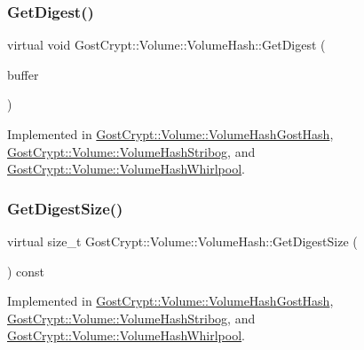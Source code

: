 \subsubsection{\texorpdfstring{Get\+Digest()}{GetDigest()}}
{\footnotesize\ttfamily virtual void Gost\+Crypt\+::\+Volume\+::\+Volume\+Hash\+::\+Get\+Digest (\begin{DoxyParamCaption}\item[{\hyperlink{class_gost_crypt_1_1_buffer_ptr}{Buffer\+Ptr} \&}]{buffer }\end{DoxyParamCaption})\hspace{0.3cm}{\ttfamily [pure virtual]}}



Implemented in \hyperlink{class_gost_crypt_1_1_volume_1_1_volume_hash_gost_hash_a6973bd428bcff6dfaaa524dc825db4ca}{Gost\+Crypt\+::\+Volume\+::\+Volume\+Hash\+Gost\+Hash}, \hyperlink{class_gost_crypt_1_1_volume_1_1_volume_hash_stribog_a90a203ac607353bad84ebb6f6ad09cda}{Gost\+Crypt\+::\+Volume\+::\+Volume\+Hash\+Stribog}, and \hyperlink{class_gost_crypt_1_1_volume_1_1_volume_hash_whirlpool_ab59cbd894c5f44c05ea98555542f8f75}{Gost\+Crypt\+::\+Volume\+::\+Volume\+Hash\+Whirlpool}.

\mbox{\label{class_gost_crypt_1_1_volume_1_1_volume_hash_a3677448f436ac856778274dafdc36ed4}} 
\subsubsection{\texorpdfstring{Get\+Digest\+Size()}{GetDigestSize()}}
{\footnotesize\ttfamily virtual size\+\_\+t Gost\+Crypt\+::\+Volume\+::\+Volume\+Hash\+::\+Get\+Digest\+Size (\begin{DoxyParamCaption}{ }\end{DoxyParamCaption}) const\hspace{0.3cm}{\ttfamily [pure virtual]}}



Implemented in \hyperlink{class_gost_crypt_1_1_volume_1_1_volume_hash_gost_hash_ae81d30ef1de076a62769fde28057762e}{Gost\+Crypt\+::\+Volume\+::\+Volume\+Hash\+Gost\+Hash}, \hyperlink{class_gost_crypt_1_1_volume_1_1_volume_hash_stribog_ad29dc8a4e0ed0f2f3e20afc2f691c74d}{Gost\+Crypt\+::\+Volume\+::\+Volume\+Hash\+Stribog}, and \hyperlink{class_gost_crypt_1_1_volume_1_1_volume_hash_whirlpool_aa43208ea8d58349c7508b090c4c1f888}{Gost\+Crypt\+::\+Volume\+::\+Volume\+Hash\+Whirlpool}.

